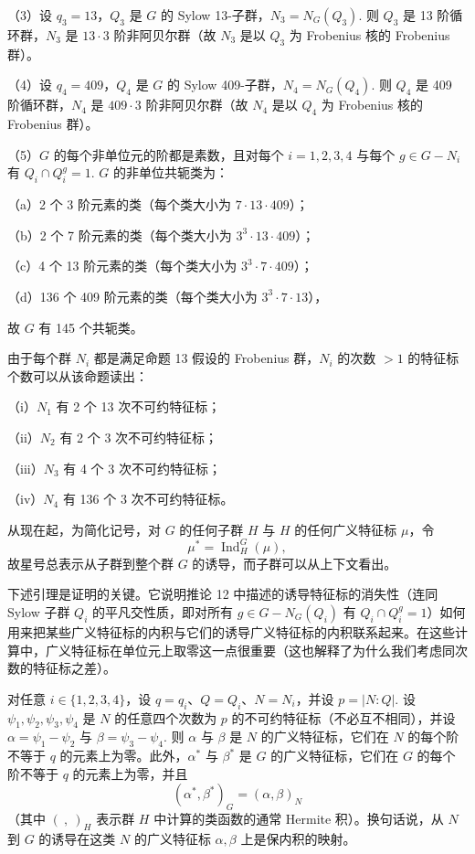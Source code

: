 （3）设 \(q_3 = 13\)，\(Q_3\) 是 \(G\) 的 Sylow 13-子群，\(N_3 = N_G(Q_3)\). 则 \(Q_3\) 是 13 阶循环群，\(N_3\) 是 \(13\cdot 3\) 阶非阿贝尔群（故 \(N_3\) 是以 \(Q_3\) 为 Frobenius 核的 Frobenius 群）。

（4）设 \(q_4 = 409\)，\(Q_4\) 是 \(G\) 的 Sylow 409-子群，\(N_4 = N_G(Q_4)\). 则 \(Q_4\) 是 409 阶循环群，\(N_4\) 是 \(409\cdot 3\) 阶非阿贝尔群（故 \(N_4\) 是以 \(Q_4\) 为 Frobenius 核的 Frobenius 群）。

（5）\(G\) 的每个非单位元的阶都是素数，且对每个 \(i = 1, 2, 3, 4\) 与每个 \(g \in G - N_i\) 有 \(Q_i \cap Q_i^g = 1\). \(G\) 的非单位共轭类为：

（a）2 个 3 阶元素的类（每个类大小为 \(7\cdot 13\cdot 409\)）；

（b）2 个 7 阶元素的类（每个类大小为 \(3^3\cdot 13\cdot 409\)）；

（c）4 个 13 阶元素的类（每个类大小为 \(3^3\cdot 7\cdot 409\)）；

（d）136 个 409 阶元素的类（每个类大小为 \(3^3\cdot 7\cdot 13\)），

故 \(G\) 有 145 个共轭类。

由于每个群 \(N_i\) 都是满足命题 13 假设的 Frobenius 群，\(N_i\) 的次数 \(> 1\) 的特征标个数可以从该命题读出：

（i）\(N_1\) 有 2 个 13 次不可约特征标；

（ii）\(N_2\) 有 2 个 3 次不可约特征标；

（iii）\(N_3\) 有 4 个 3 次不可约特征标；

（iv）\(N_4\) 有 136 个 3 次不可约特征标。

从现在起，为简化记号，对 \(G\) 的任何子群 \(H\) 与 \(H\) 的任何广义特征标 \(\mu\)，令
\[
\mu^* = \operatorname{Ind}_H^G(\mu),
\]
故星号总表示从子群到整个群 \(G\) 的诱导，而子群可以从上下文看出。

下述引理是证明的关键。它说明推论 12 中描述的诱导特征标的消失性（连同 Sylow 子群 \(Q_i\) 的平凡交性质，即对所有 \(g \in G - N_G(Q_i)\) 有 \(Q_i \cap Q_i^g = 1\)）如何用来把某些广义特征标的内积与它们的诱导广义特征标的内积联系起来。在这些计算中，广义特征标在单位元上取零这一点很重要（这也解释了为什么我们考虑同次数的特征标之差）。

\begin{lemma}\label{lem:19.15}
对任意 \(i \in \{1,2,3,4\}\)，设 \(q = q_i\)、\(Q = Q_i\)、\(N = N_i\)，并设 \(p = |N : Q|\). 设 \(\psi_1, \psi_2, \psi_3, \psi_4\) 是 \(N\) 的任意四个次数为 \(p\) 的不可约特征标（不必互不相同），并设 \(\alpha = \psi_1-\psi_2\) 与 \(\beta = \psi_3-\psi_4\). 则 \(\alpha\) 与 \(\beta\) 是 \(N\) 的广义特征标，它们在 \(N\) 的每个阶不等于 \(q\) 的元素上为零。此外，\(\alpha^*\) 与 \(\beta^*\) 是 \(G\) 的广义特征标，它们在 \(G\) 的每个阶不等于 \(q\) 的元素上为零，并且
\[
(\alpha^*, \beta^*)_G = (\alpha, \beta)_N
\]
（其中 \((\ ,\ )_H\) 表示群 \(H\) 中计算的类函数的通常 Hermite 积）。换句话说，从 \(N\) 到 \(G\) 的诱导在这类 \(N\) 的广义特征标 \(\alpha, \beta\) 上是保内积的映射。
\end{lemma}

